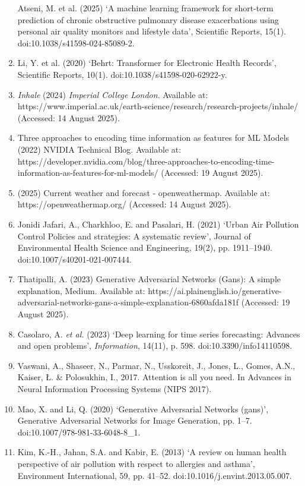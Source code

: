 \documentclass[
]{article}
\begin{document}
\begin{enumerate}
  Atseni, M. et al. (2025) `A machine learning framework for short-term
  prediction of chronic obstructive pulmonary disease exacerbations
  using personal air quality monitors and lifestyle data', Scientific
  Reports, 15(1). doi:10.1038/s41598-024-85089-2.
\item
  Li, Y. et al. (2020) `Behrt: Transformer for Electronic Health
  Records', Scientific Reports, 10(1). doi:10.1038/s41598-020-62922-y.
\item
  \emph{Inhale} (2024) \emph{Imperial College London}. Available at:
  https://www.imperial.ac.uk/earth-science/research/research-projects/inhale/
  (Accessed: 14 August 2025).
\item
  Three approaches to encoding time information as features for ML
  Models (2022) NVIDIA Technical Blog. Available at:
  https://developer.nvidia.com/blog/three-approaches-to-encoding-time-information-as-features-for-ml-models/
  (Accessed: 19 August 2025).
\item
  (2025) Current weather and forecast - openweathermap. Available at:
  https://openweathermap.org/ (Accessed: 14 August 2025).
\item
  Jonidi Jafari, A., Charkhloo, E. and Pasalari, H. (2021) `Urban Air
  Pollution Control Policies and strategies: A systematic review',
  Journal of Environmental Health Science and Engineering, 19(2), pp.
  1911--1940. doi:10.1007/s40201-021-007444.
\item
  Thatipalli, A. (2023) Generative Adversarial Networks (Gans): A simple
  explanation, Medium. Available at:
  https://ai.plainenglish.io/generative-adversarial-networks-gans-a-simple-explanation-6860afda181f
  (Accessed: 19 August 2025).
\item
  Casolaro, A. \emph{et al.} (2023) `Deep learning for time series
  forecasting: Advances and open problems', \emph{Information}, 14(11),
  p. 598. doi:10.3390/info14110598.
\item
  Vaswani, A., Shaseer, N., Parmar, N., Usskoreit, J., Jones, L., Gomes,
  A.N., Kaiser, Ł. \& Polosukhin, I., 2017. Attention is all you need.
  In Advances in Neural Information Processing Systems (NIPS 2017).
\item
  Mao, X. and Li, Q. (2020) `Generative Adversarial Networks (gans)',
  Generative Adversarial Networks for Image Generation, pp. 1--7.
  doi:10.1007/978-981-33-6048-8\_1.
\item
  Kim, K.-H., Jahan, S.A. and Kabir, E. (2013) `A review on human health
  perspective of air pollution with respect to allergies and asthma',
  Environment International, 59, pp. 41--52.
  doi:10.1016/j.envint.2013.05.007.
\end{enumerate}
\end{document}

